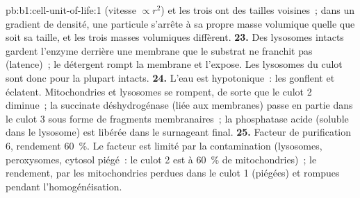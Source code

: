 \begin{solution}{pb:b1:cell-unit-of-life:1}
(vitesse $\propto r^2$) et les trois  ont des tailles
voisines~; dans un gradient de densité, une particule s'arrête à sa
propre masse volumique quelle que soit sa taille, et les trois masses
volumiques diffèrent.
\textbf{23.} Des lysosomes intacts gardent l'enzyme derrière une
membrane que le substrat ne franchit pas (latence)~; le détergent rompt
la membrane et l'expose. Les lysosomes du culot sont donc pour la
plupart intacts.
\textbf{24.} L'eau est hypotonique~: les  gonflent et éclatent.
Mitochondries et lysosomes se rompent, de sorte que le culot 2 diminue~;
la succinate déshydrogénase (liée aux membranes) passe en partie dans le
culot 3 sous forme de fragments membranaires~; la phosphatase acide
(soluble dans le lysosome) est libérée dans le surnageant final.
\textbf{25.} Facteur de purification $6$, rendement \qty{60}{\%}. Le
facteur est limité par la contamination (lysosomes, peroxysomes, cytosol
piégé~: le culot 2 est à \qty{60}{\%} de mitochondries)~; le rendement,
par les mitochondries perdues dans le culot 1 (piégées) et rompues
pendant l'homogénéisation.
\end{solution}
